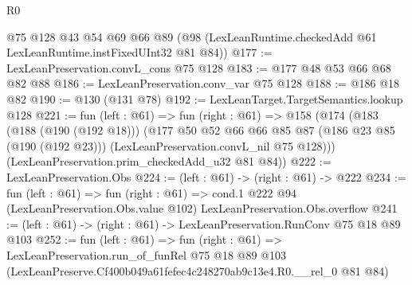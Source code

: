 \begin{lexlean}{R0}
\begin{coremodule}
    @75
    @128
    @43
    @54
    @69
    @66
    @89
    (@98 (LexLeanRuntime.checkedAdd @61 LexLeanRuntime.instFixedUInt32 @81 @84))
@177 := LexLeanPreservation.convL_cons @75 @128
@183 := @177 @48 @53 @66 @68 @82 @88
@186 := LexLeanPreservation.conv_var @75 @128
@188 := @186 @18 @82
@190 := @130 (@131 @78)
@192 := LexLeanTarget.TargetSemantics.lookup @128
@221 := fun (left : @61) =>
  fun (right : @61) =>
  @158
    (@174
      (@183
        (@188 (@190 (@192 @18)))
        (@177
          @50
          @52
          @66
          @66
          @85
          @87
          (@186 @23 @85 (@190 (@192 @23)))
          (LexLeanPreservation.convL_nil @75 @128)))
      (LexLeanPreservation.prim_checkedAdd_u32 @81 @84))
@222 := LexLeanPreservation.Obs
@224 := (left : @61) -> (right : @61) -> @222
@234 := fun (left : @61) =>
  fun (right : @61) =>
  cond.{1} @222 @94 (LexLeanPreservation.Obs.value @102) LexLeanPreservation.Obs.overflow
@241 := (left : @61) -> (right : @61) -> LexLeanPreservation.RunConv @75 @18 @89 @103
@252 := fun (left : @61) =>
  fun (right : @61) =>
  LexLeanPreservation.run_of_funRel
    @75
    @18
    @89
    @103
    (LexLeanPreserve.Cf400b049a61fefec4c248270ab9c13e4.R0.__rel_0 @81 @84)
\end{coremodule}
\end{lexlean}
